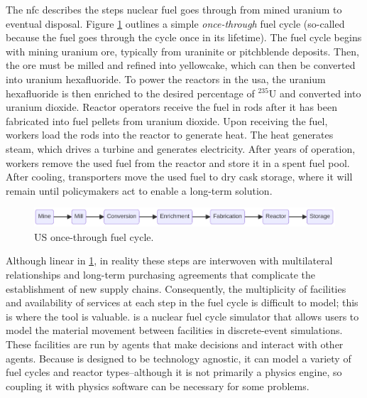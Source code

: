 The \gls{nfc} describes the steps nuclear fuel goes through
from mined uranium to eventual disposal. Figure \ref{fig:once-through} outlines a simple \textit{once-through} fuel cycle (so-called because the fuel goes through the cycle once in its lifetime). The fuel cycle begins with mining uranium ore, typically from uraninite or pitchblende deposits. Then, the ore must be milled and refined into yellowcake, which can then be converted into uranium hexafluoride. To power the reactors in the \gls{usa}, the uranium hexafluoride is then enriched to the desired percentage of $^{235}$U and converted into uranium dioxide. Reactor operators receive the fuel in rods after it has been fabricated into fuel pellets from uranium dioxide. Upon receiving the fuel, workers load the rods into the reactor to generate heat. The heat generates steam, which drives a turbine and generates electricity. After years of operation, workers remove the used fuel from the reactor and store it in a spent fuel pool. After cooling, transporters move the used fuel to dry cask storage, where it will remain until policymakers act to enable a long-term solution.

\begin{figure}[H]
    \centering
    \includegraphics[scale=0.40]{images/once_through_fc.png}
    \caption{US once-through fuel cycle.}
    \label{fig:once-through}
\end{figure}

Although linear in \ref{fig:once-through}, in reality these steps are interwoven with multilateral relationships and long-term purchasing agreements that complicate the establishment of new supply chains. Consequently, the multiplicity of facilities and availability of services at each step in the fuel cycle is difficult to model; this is where the \cyclus \cite{huff_cyclus_intro_2016} tool is valuable. \cyclus is a nuclear fuel cycle simulator that allows users to model the material movement between facilities in discrete-event simulations. These facilities are run by agents that make decisions and interact with other agents. Because \cyclus is designed to be technology agnostic, it can model a variety of fuel cycles and reactor types--although it is not primarily a physics engine, so coupling it with physics software can be necessary for some problems.

